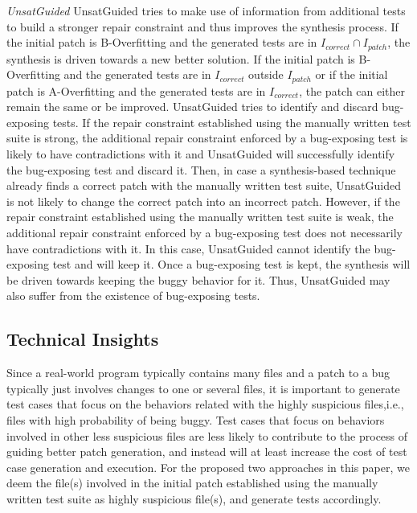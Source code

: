 \documentclass[]{sig-alternate}
\begin{document}
\emph{UnsatGuided}
UnsatGuided tries to make use of information from additional tests to build a stronger repair constraint and thus improves the synthesis process. 
If the initial patch is B-Overfitting and the generated tests are in $I_{correct} \cap I_{patch}$, the synthesis is driven towards a new better solution.
If the initial patch is B-Overfitting and the generated tests are in $I_{correct}$ outside $I_{patch}$ or if the initial patch is A-Overfitting and the generated tests are in $I_{correct}$, the patch can either remain the same or be improved.
UnsatGuided tries to identify and discard bug-exposing tests. If the repair constraint established using the manually written test suite is strong, the additional repair constraint enforced by a bug-exposing test is likely to have contradictions with it and UnsatGuided will successfully identify the bug-exposing test and discard it. Then, in case a synthesis-based technique already finds a correct patch with the manually written test suite, UnsatGuided is not likely to change the correct patch into an incorrect patch. However, if the repair constraint established using the manually written test suite is weak, the additional repair constraint enforced by a bug-exposing test does not necessarily have contradictions with it. In this case, UnsatGuided cannot identify the bug-exposing test and will keep it. Once a bug-exposing test is kept, the synthesis will be driven towards keeping the buggy behavior for it. Thus, UnsatGuided may also suffer from the existence of bug-exposing tests. 

\subsection{Technical Insights}

Since a real-world program typically contains many files and a patch to a bug typically just involves changes to one or several files, it is important to generate test cases that focus on the behaviors related with the highly suspicious files,i.e., files with high probability of being buggy. Test cases that focus on behaviors involved in other less suspicious files are less likely to contribute to the process of guiding better patch generation, and instead will at least increase the cost of test case generation and execution. For the proposed two approaches in this paper, we deem the file(s) involved in the initial patch established using the manually written test suite as highly suspicious file(s), and generate tests accordingly.  
\end{document}
